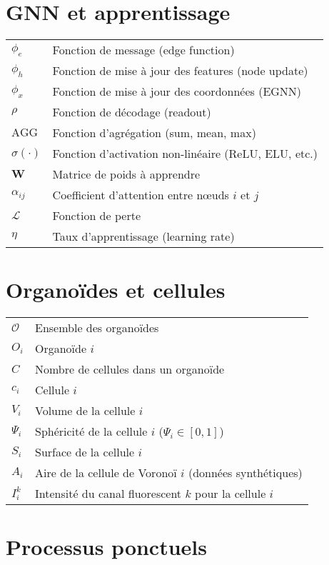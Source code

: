 \section*{GNN et apprentissage}

\begin{tabular}{p{2.5cm} p{11cm}}
  \hline
  $\phi_e$ & Fonction de message (edge function)\\
  $\phi_h$ & Fonction de mise à jour des features (node update)\\
  $\phi_x$ & Fonction de mise à jour des coordonnées (EGNN)\\
  $\rho$ & Fonction de décodage (readout)\\
  $\text{AGG}$ & Fonction d'agrégation (sum, mean, max)\\
  $\sigma(\cdot)$ & Fonction d'activation non-linéaire (ReLU, ELU, etc.)\\
  $\mathbf{W}$ & Matrice de poids à apprendre\\
  $\alpha_{ij}$ & Coefficient d'attention entre nœuds $i$ et $j$\\
  $\mathcal{L}$ & Fonction de perte\\
  $\eta$ & Taux d'apprentissage (learning rate)\\
  \hline
\end{tabular}

\section*{Organoïdes et cellules}

\begin{tabular}{p{2.5cm} p{11cm}}
  \hline
  $\mathcal{O}$ & Ensemble des organoïdes\\
  $O_i$ & Organoïde $i$\\
  $C$ & Nombre de cellules dans un organoïde\\
  $c_i$ & Cellule $i$\\
  $V_i$ & Volume de la cellule $i$\\
  $\Psi_i$ & Sphéricité de la cellule $i$ ($\Psi_i \in [0,1]$)\\
  $S_i$ & Surface de la cellule $i$\\
  $A_i$ & Aire de la cellule de Voronoï $i$ (données synthétiques)\\
  $I_i^k$ & Intensité du canal fluorescent $k$ pour la cellule $i$\\
  \hline
\end{tabular}

\section*{Processus ponctuels}

